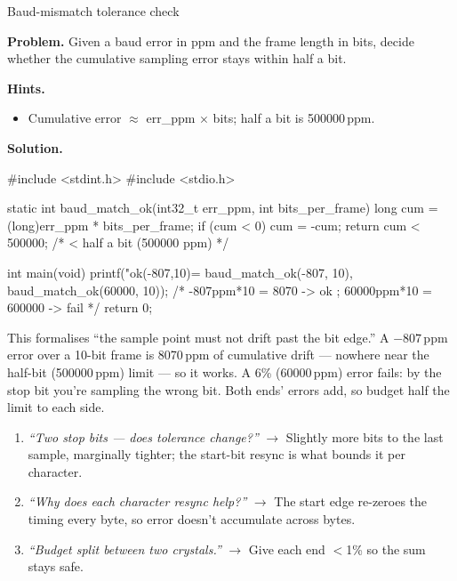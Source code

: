 \begin{gymproblem}{Baud-mismatch tolerance check}

\textbf{Problem.} Given a baud error in ppm and the frame length in bits,
decide whether the cumulative sampling error stays within half a bit.

\textbf{Hints.}
\begin{itemize}
\item Cumulative error $\approx$ err\_ppm $\times$ bits; half a bit is
  500000\,ppm.
\end{itemize}

\attempt

\textbf{Solution.}
\begin{cgym}
#include <stdint.h>
#include <stdio.h>

static int baud_match_ok(int32_t err_ppm, int bits_per_frame) {
    long cum = (long)err_ppm * bits_per_frame;
    if (cum < 0) cum = -cum;
    return cum < 500000;          /* < half a bit (500000 ppm) */
}

int main(void) {
    printf("ok(-807,10)=%
           baud_match_ok(-807, 10), baud_match_ok(60000, 10));
    /* -807ppm*10 = 8070 -> ok ; 60000ppm*10 = 600000 -> fail */
    return 0;
}
\end{cgym}

This formalises ``the sample point must not drift past the bit edge.'' A
$-807$\,ppm error over a 10-bit frame is 8070\,ppm of cumulative drift ---
nowhere near the half-bit (500000\,ppm) limit --- so it works. A 6\% (60000\,ppm)
error fails: by the stop bit you're sampling the wrong bit. Both ends' errors
add, so budget half the limit to each side.

\followups
\begin{enumerate}
\item \emph{``Two stop bits --- does tolerance change?''} $\rightarrow$ Slightly
  more bits to the last sample, marginally tighter; the start-bit resync is
  what bounds it per character.
\item \emph{``Why does each character resync help?''} $\rightarrow$ The start
  edge re-zeroes the timing every byte, so error doesn't accumulate across
  bytes.
\item \emph{``Budget split between two crystals.''} $\rightarrow$ Give each end
  $<$1\% so the sum stays safe.
\end{enumerate}
\end{gymproblem}

